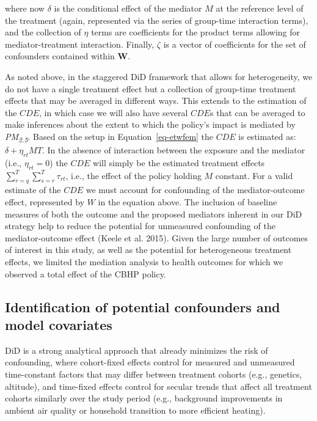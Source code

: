 \documentclass[
  letterpaper,
  DIV=11,
  numbers=noendperiod]{scrartcl}
\begin{document}
where now \(\delta\) is the conditional effect of the mediator \(M\) at
the reference level of the treatment (again, represented via the series
of group-time interaction terms), and the collection of \(\eta\) terms
are coefficients for the product terms allowing for mediator-treatment
interaction. Finally, \(\zeta\) is a vector of coefficients for the set
of confounders contained within \(\mathbf{W}\).

As noted above, in the staggered DiD framework that allows for
heterogeneity, we do not have a single treatment effect but a collection
of group-time treatment effects that may be averaged in different ways.
This extends to the estimation of the \(CDE\), in which case we will
also have several \(CDE\)s that can be averaged to make inferences about
the extent to which the policy's impact is mediated by
\emph{PM\textsubscript{2.5}}. Based on the setup in
Equation~\ref{eq-etwfem} the \(CDE\) is estimated as:
\(\delta + \eta_{rt}MT\). In the absence of interaction between the
exposure and the mediator (i.e., \(\eta_{rt}=0\)) the \(CDE\) will
simply be the estimated treatment effects
\(\sum_{r=q}^{T} \sum_{s=r}^{T} \tau_{rt}\), i.e., the effect of the
policy holding \(M\) constant. For a valid estimate of the \(CDE\) we
must account for confounding of the mediator-outcome effect, represented
by \(W\) in the equation above. The inclusion of baseline measures of
both the outcome and the proposed mediators inherent in our DiD strategy
help to reduce the potential for unmeasured confounding of the
mediator-outcome effect (Keele et al. 2015). Given the large number of
outcomes of interest in this study, as well as the potential for
heterogeneous treatment effects, we limited the mediation analysis to
health outcomes for which we observed a total effect of the CBHP policy.

\hypertarget{identification-of-potential-confounders-and-model-covariates}{%
\subsection{Identification of potential confounders and model
covariates}\label{identification-of-potential-confounders-and-model-covariates}}

DiD is a strong analytical approach that already minimizes the risk of
confounding, where cohort-fixed effects control for measured and
unmeasured time-constant factors that may differ between treatment
cohorts (e.g., genetics, altitude), and time-fixed effects control for
secular trends that affect all treatment cohorts similarly over the
study period (e.g., background improvements in ambient air quality or
household transition to more efficient heating).
\end{document}

